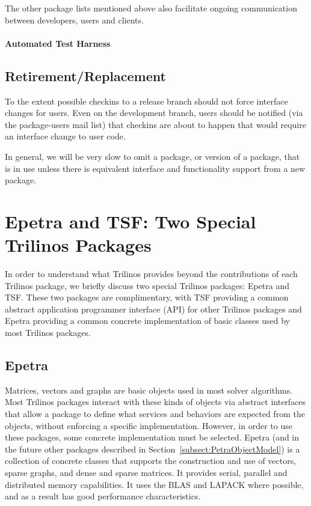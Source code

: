 \documentclass[12pt,relax]{TrilinosDevGuide}
\begin{document}
The other package lists mentioned above also facilitate ongoing
communication between developers, users and clients.

\paragraph{Automated Test Harness}

\subsection{Retirement/Replacement}
To the extent possible checkins to a release branch should not force interface 
changes for users.  Even on the development branch, users should be notified 
(via the package-users mail list) that checkins are about to happen that would 
require an interface change to user code.

In general, we will be very slow to omit a package, or version of a package, 
that is in use unless there is equivalent interface and functionality support 
from a new package.

\section{Epetra and TSF: Two Special Trilinos Packages}
\label{Section:EpetraAndTSF}
In order to understand what Trilinos provides beyond the
contributions of each Trilinos package, we briefly discuss two special
Trilinos packages: Epetra and TSF.  These two packages are complimentary,
with TSF providing a common abstract application
programmer interface (API) for other Trilinos packages and Epetra
providing a common concrete implementation of basic classes used by most
Trilinos packages.

\subsection{Epetra}
Matrices, vectors and graphs are basic objects used in most solver
algorithms. Most Trilinos
packages interact with these kinds of objects via abstract interfaces that
allow a package to define what services and behaviors are expected from the objects,
without enforcing a specific implementation.  However, in order to use
these packages, some concrete
implementation must be selected.  Epetra (and in the future other packages described
in Section~\ref{subsect:PetraObjectModel}) is a collection of concrete
classes that supports the construction and use of vectors, sparse
graphs, and dense and sparse matrices.  It provides serial, parallel and
 distributed memory
capabilities.  It uses the BLAS and LAPACK where possible, and as a
result has good performance characteristics.
\end{document}
